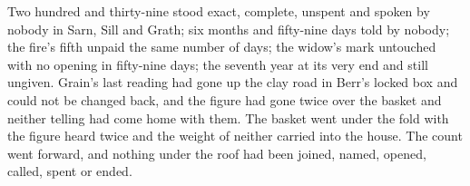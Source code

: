 Two hundred and thirty-nine stood exact, complete, unspent and spoken by nobody in Sarn, Sill and Grath; six months and fifty-nine days told by nobody; the fire's fifth unpaid the same number of days; the widow's mark untouched with no opening in fifty-nine days; the seventh year at its very end and still ungiven. Grain's last reading had gone up the clay road in Berr's locked box and could not be changed back, and the figure had gone twice over the basket and neither telling had come home with them. The basket went under the fold with the figure heard twice and the weight of neither carried into the house. The count went forward, and nothing under the roof had been joined, named, opened, called, spent or ended.
